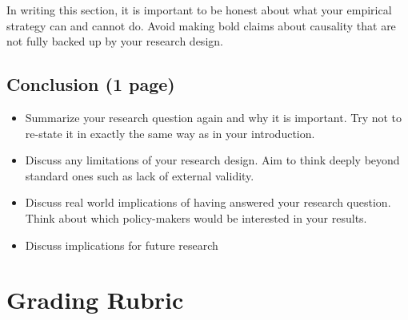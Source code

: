 \documentclass[
]{article}
\begin{document}
In writing this section, it is important to be honest about what your empirical strategy can and cannot do. Avoid making bold claims about causality that are not fully backed up by your research design.

\hypertarget{conclusion-1-page}{%
\subsection{Conclusion (1 page)}\label{conclusion-1-page}}

\begin{itemize}
\item
  Summarize your research question again and why it is important. Try not to re-state it in exactly the same way as in your introduction.
\item
  Discuss any limitations of your research design. Aim to think deeply beyond standard ones such as lack of external validity.
\item
  Discuss real world implications of having answered your research question. Think about which policy-makers would be interested in your results.
\item
  Discuss implications for future research
\end{itemize}

\clearpage

\hypertarget{grading-rubric}{%
\section{Grading Rubric}\label{grading-rubric}}
\end{document}

